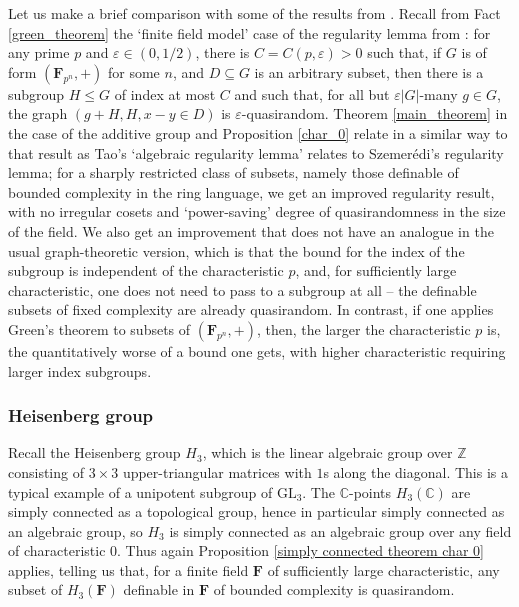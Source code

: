 \documentclass[10pt]{article}
\begin{document}
{ Let us make a brief comparison with some of the results from \cite{green}. Recall from Fact \ref{green_theorem} the `finite field model' case of the regularity lemma from \cite{green}: for any prime $p$ and $\varepsilon\in(0,1/2)$, there is $C=C(p,\varepsilon)>0$ such that, if $G$ is of form $(\mathbf{F}_{p^n},+)$ for some $n$, and $D\subseteq G$ is an arbitrary subset, then there is a subgroup $H\leqslant G$ of index at most $C$ and such that, for all but $\varepsilon|G|$-many $g\in G$, the graph $(g+H,H,x-y\in D)$ is $\varepsilon$-quasirandom. Theorem \ref{main_theorem} in the case of the additive group and Proposition \ref{char_0} relate in a similar way to that result as Tao's `algebraic regularity lemma' relates to Szemerédi's regularity lemma; for a sharply restricted class of subsets, namely those definable of bounded complexity in the ring language, we get an improved regularity result, with no irregular cosets and `power-saving' degree of quasirandomness in the size of the field. We also get an improvement that does not have an analogue in the usual graph-theoretic version, which is that the bound for the index of the subgroup is independent of the characteristic $p$, and, for sufficiently large characteristic, one does not need to pass to a subgroup at all – the definable subsets of fixed complexity are already quasirandom. In contrast, if one applies Green's theorem to subsets of $(\mathbf{F}_{p^n},+)$, then, the larger the characteristic $p$ is, the quantitatively worse of a bound one gets, with higher characteristic requiring larger index subgroups.

 \subsubsection{Heisenberg group}
 Recall the Heisenberg group $H_3$, which is the linear algebraic group over $\mathbb{Z}$ consisting of $3\times 3$ upper-triangular matrices with $1$s along the diagonal. This is a typical example of a unipotent subgroup of $\mathrm{GL}_3$. The $\mathbb{C}$-points $H_3(\mathbb{C})$ are simply connected as a topological group, hence in particular simply connected as an algebraic group, so $H_3$ is simply connected as an algebraic group over any field of characteristic $0$. Thus again Proposition \ref{simply connected theorem char 0} applies, telling us that, for a finite field $\mathbf{F}$ of sufficiently large characteristic, any subset of $H_3(\mathbf{F})$ definable in $\mathbf{F}$ of bounded complexity is quasirandom.

}
\end{document}
